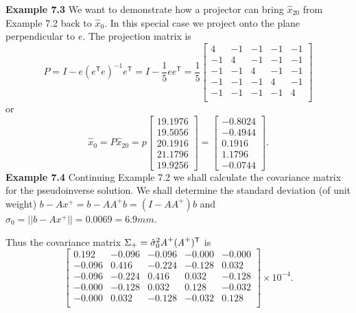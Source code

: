 \par\noindent
\textbf{Example 7.3} We want to demonstrate how a projector can bring $\hat{x}_{20}$ from Example 7.2 back to $\hat{x}_{0}$. In this special case we project onto the plane perpendicular to $e$. The projection matrix is
\begin{equation*}
	P
	= I - e(e^\mathsf{T}e)^{-1}e^\mathsf{T}
	= I - \frac{1}{5}ee^\mathsf{T}
	= \frac{1}{5}
	\begin{bmatrix}
		4 & -1 & -1 & -1 & -1\\
		-1 & 4  & -1 & -1 & -1\\
		-1 & -1 &  4 & -1 & -1\\
		-1 & -1 & -1 &  4 & -1\\
		-1 & -1 & -1 & -1 & 4\\
	\end{bmatrix}
\end{equation*}
or
\begin{equation*}
	\hat{x}_{0}
	=P\hat{x}_{20}
	= p
	\begin{bmatrix}
		19.1976\\
		19.5056\\
		20.1916\\
		21.1796\\
		19.9256
	\end{bmatrix}
	=\begin{bmatrix}
		-0.8024\\
		-0.4944\\
		0.1916\\
		1.1796\\
		-0.0744
	\end{bmatrix}.
\end{equation*}
\textbf{Example 7.4} Continuing Example 7.2 we shall calculate the covariance matrix for the
pseudoinverse solution. We shall determine the standard deviation (of unit weight)
$b - Ax^{+} = b - AA^{+}b
= (I - AA^{+})b$
and $\hat{\sigma}_0 = ||b - Ax^{+}||
= 0.0069 = 6.9mm.$
\par\noindent
Thus the covariance matrix $\Sigma_+ = {\hat{\sigma}_0}^2\emph{A}^{+}(\emph{A}^{+})^\mathsf{T}$ is
\begin{equation*}
	\begin{bmatrix}
		0.192 & -0.096 & -0.096 & -0.000 & -0.000\\
		-0.096 & 0.416  & -0.224 & -0.128 & 0.032\\
		-0.096 & -0.224 & 0.416  & 0.032  & -0.128\\
		-0.000 & -0.128 & 0.032  & 0.128  & -0.032\\
		-0.000 & 0.032  & -0.128 & -0.032 & 0.128\\
	\end{bmatrix}\times10^{-4}.
\end{equation*}

